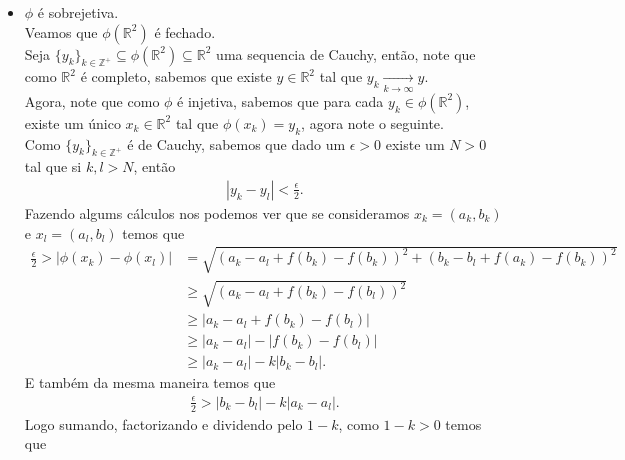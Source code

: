 \begin{homeworkProblem}[Seção 1-2]
\begin{solution}
\begin{itemize}
\begin{itemize}
            Da mesma maneira y usando \eqref{eq:1-2-2} temos que
            \begin{align*}
              |y_1-y_2|=|f(x_2)-f(x_1)|< |x_1-x_2|< |y_1-y_2|. 
            \end{align*}
            Logo isto só é posivel si $y_1=y_2$ o que implica direitamente que $x_1=x_2$, pelo que sabemos que $\phi$ é injetiva.
          \item $\phi$ é sobrejetiva.\\
            Veamos que $\phi(\mathbb{R}^{2})$ é fechado.\\
            Seja $\{y_k\}_{k\in\mathbb{Z}^{+}}\subseteq \phi(\mathbb{R}^{2})\subseteq \mathbb{R}^{2}$ uma sequencia de Cauchy, então, note que como $\mathbb{R}^{2}$ é completo, sabemos que existe $y\in\mathbb{R}^{2}$ tal que $y_k\xrightarrow[k\to\infty]{}y$.\\
            Agora, note que como $\phi$ é injetiva, sabemos que para cada $y_k\in\phi(\mathbb{R}^{2})$, existe um único $x_k\in\mathbb{R}^{2}$ tal que $\phi(x_k)=y_k$, agora note o seguinte.\\
            Como $\{y_k\}_{k\in\mathbb{Z}^{+}}$ é de Cauchy, sabemos que dado um $\epsilon>0$ existe um $N>0$ tal que si $k,l>N$, então
            \begin{align*}
              |y_k-y_l|<\frac{\epsilon}{2}.
            \end{align*}
            Fazendo algums cálculos nos podemos ver que se consideramos $x_{k}=(a_k,b_k)$ e $x_l=(a_l,b_l)$ temos que 
            \begin{align*}
              \frac{\epsilon}{2}>\left| \phi(x_k)-\phi(x_l) \right|&=\sqrt{\left( a_k-a_l+f(b_k)-f(b_k) \right)^{2}+\left( b_k-b_l+f(a_k)-f(b_k) \right)^{2}}\\
              &\geq \sqrt{\left( a_k-a_l+f(b_k)-f(b_l) \right)^2}\\
              &\geq \left| a_k-a_l+f(b_k)-f(b_l) \right|\\
              &\geq \left| a_k-a_l\right|-\left|f(b_k)-f(b_l) \right|\\
              &\geq \left| a_k-a_l \right|-k\left| b_k-b_l \right|.
            \end{align*}
            E também da mesma maneira temos que
            \begin{align*}
              \frac{\epsilon}{2}>\left| b_k-b_l \right|-k\left| a_k-a_l \right|.
            \end{align*}
            Logo sumando, factorizando e dividendo pelo $1-k$, como $1-k>0$ temos que

\end{itemize}
\end{itemize}
\end{solution}
\end{homeworkProblem}
